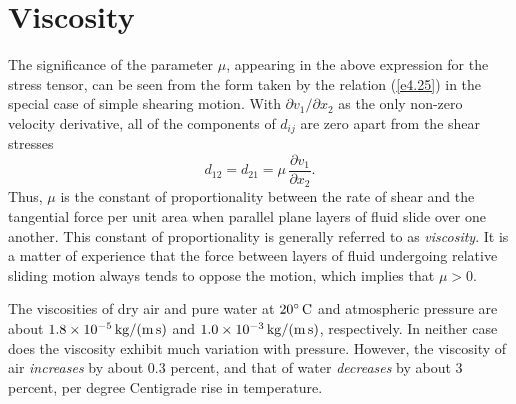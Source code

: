 \section{Viscosity}
The significance of the parameter $\mu$, appearing in the above expression for the stress tensor, can be seen from the form taken by the relation (\ref{e4.25}) in the
special case of simple shearing motion. With $\partial v_1/\partial x_2$ as the only non-zero
velocity derivative, all of the components of $d_{ij}$ are zero apart from the
shear stresses
\begin{equation}
d_{12} = d_{21} = \mu\,\frac{\partial v_1}{\partial x_2}.
\end{equation}
Thus, $\mu$ is the constant of proportionality between the rate of shear and the tangential
force per unit area when parallel plane layers of fluid slide over one another. This constant of proportionality is generally
referred to as {\em viscosity}. It is a matter of experience that the force between layers
of fluid undergoing relative sliding motion  always  tends to oppose
the  motion, which implies that  $\mu>0$. 

The viscosities of dry air and pure water at $20^\circ\,{\rm C}$  and atmospheric pressure are about $1.8 \times 10^{-5}\, {\rm kg/(m\,s)}$
and $1.0\times 10^{-3}\, {\rm kg/(m\,s)}$, respectively. In neither case does the viscosity exhibit
much variation with pressure. However, the viscosity of air {\em increases}\/ by about $0.3$ percent, and
that of water {\em decreases}\/ by about 3 percent, per degree Centigrade 
rise in temperature. 

